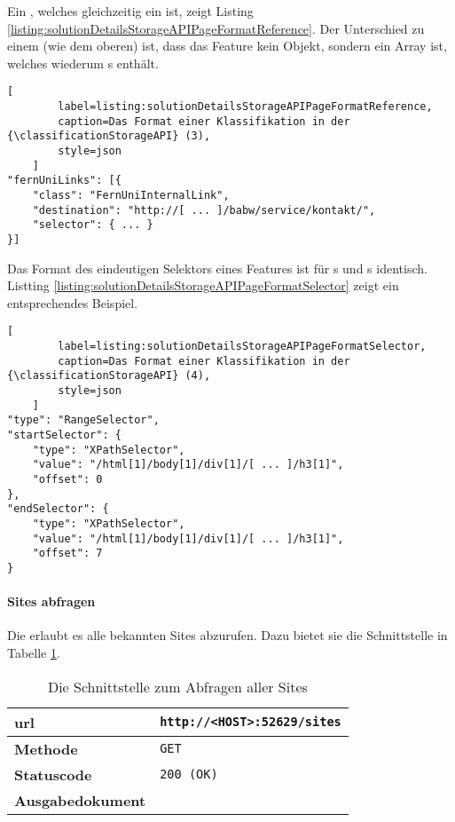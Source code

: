     Ein {}, welches gleichzeitig ein {\collectionFeature} ist,
    zeigt Listing \ref{listing:solutionDetailsStorageAPIPageFormatReference}.
    Der Unterschied zu einem {\scalarFeature} (wie dem oberen) ist,
    dass das Feature kein Objekt, sondern ein Array ist,
    welches wiederum {\scalarFeature}s enthält.

    \begin{lstlisting}[
        label=listing:solutionDetailsStorageAPIPageFormatReference,
        caption=Das Format einer Klassifikation in der {\classificationStorageAPI} (3),
        style=json
    ]
"fernUniLinks": [{
    "class": "FernUniInternalLink",
    "destination": "http://[ ... ]/babw/service/kontakt/",
    "selector": { ... }
}]
    \end{lstlisting}

    Das Format des eindeutigen Selektors eines Features ist für {\contentFeature}s
    und {}s identisch.
    Listting \ref{listing:solutionDetailsStorageAPIPageFormatSelector} zeigt ein entsprechendes Beispiel.

    \begin{lstlisting}[
        label=listing:solutionDetailsStorageAPIPageFormatSelector,
        caption=Das Format einer Klassifikation in der {\classificationStorageAPI} (4),
        style=json
    ]
"type": "RangeSelector",
"startSelector": {
    "type": "XPathSelector",
    "value": "/html[1]/body[1]/div[1]/[ ... ]/h3[1]",
    "offset": 0
},
"endSelector": {
    "type": "XPathSelector",
    "value": "/html[1]/body[1]/div[1]/[ ... ]/h3[1]",
    "offset": 7
}
    \end{lstlisting}

    \paragraph{Sites abfragen}
    Die {\classificationStorageAPI} erlaubt es alle bekannten Sites abzurufen.
    Dazu bietet sie die Schnittstelle in Tabelle \ref{table:getSitesInterface}.

    \begin{table}[htb]
        \centering
        \begin{tabular}{|l|l|}
        \hline
        \textbf{\gls{url}} & \texttt{http://<HOST>:52629/sites}\\
        \hline
        \textbf{Methode} & \texttt{GET}\\
        \hline
        \textbf{Statuscode} & \texttt{200 (OK)}\\
        \hline
        \textbf{Ausgabedokument} & \\
        \hline
        \end{tabular}
        \caption{Die Schnittstelle zum Abfragen aller Sites}
        \label{table:getSitesInterface}
    \end{table}

